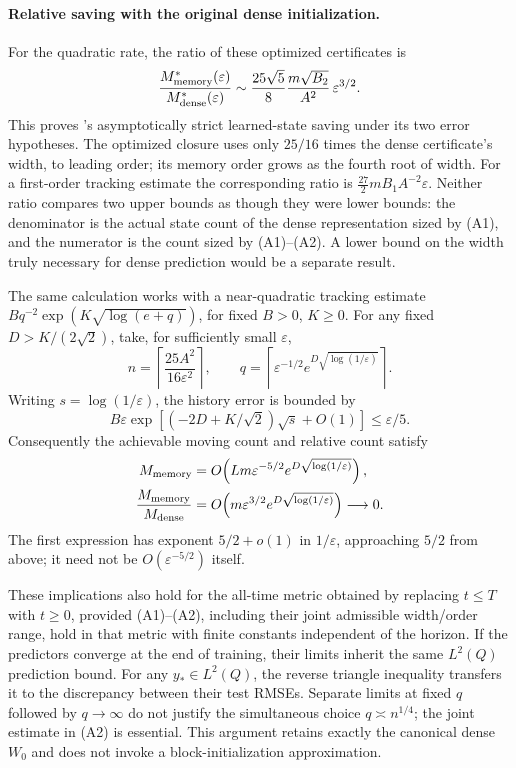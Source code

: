 \paragraph{Relative saving with the original dense initialization.}
For the quadratic rate, the ratio of these optimized certificates is
\begin{equation}
 \frac{M_{\rm memory}^*(\varepsilon)}{M_{\rm dense}^*(\varepsilon)}
 \sim\frac{25\sqrt5}{8}\frac{m\sqrt{B_2}}{A^2}\,
       \varepsilon^{3/2}.
 \label{cmp:relative-saving}
\end{equation}
This proves 's asymptotically strict learned-state
saving under its two error hypotheses.  The optimized closure uses only
$25/16$ times the dense certificate's width, to leading order; its memory
order grows as the fourth root of width.  For a first-order tracking estimate
the corresponding ratio is
$\tfrac{27}{2}mB_1A^{-2}\varepsilon$.
Neither ratio compares two upper bounds as though they were lower bounds:
the denominator is the actual state count of the dense representation sized
by (A1), and the numerator is the count sized by (A1)--(A2).  A lower bound on
the width truly necessary for dense prediction would be a separate result.

The same calculation works with a near-quadratic tracking estimate
$Bq^{-2}\exp(K\sqrt{\log(e+q)})$, for fixed $B>0$, $K\ge0$.
For any fixed $D>K/(2\sqrt2)$, take, for sufficiently small $\varepsilon$,
\[
 n=\left\lceil\frac{25A^2}{16\varepsilon^2}\right\rceil,\qquad
 q=\left\lceil\varepsilon^{-1/2}
                   e^{D\sqrt{\log(1/\varepsilon)}}\right\rceil.
\]
Writing $s=\log(1/\varepsilon)$, the history error is bounded by
\[
 B\varepsilon\exp\!\left[
       (-2D+K/\sqrt2)\sqrt s+O(1)\right]
 \le\varepsilon/5.
\]
Consequently the achievable moving count and relative count satisfy
\begin{align*}
 M_{\rm memory}&=O\!\left(Lm\varepsilon^{-5/2}
                               e^{D\sqrt{\log(1/\varepsilon)}}\right),\\
 \frac{M_{\rm memory}}{M_{\rm dense}}
   &=O\!\left(m\varepsilon^{3/2}
                               e^{D\sqrt{\log(1/\varepsilon)}}\right)
     \longrightarrow0.
\end{align*}
The first expression has exponent $5/2+o(1)$ in $1/\varepsilon$, approaching
$5/2$ from above; it need not be $O(\varepsilon^{-5/2})$ itself.

These implications also hold for the all-time metric obtained by replacing
$t\le T$ with $t\ge0$, provided (A1)--(A2), including their joint admissible
width/order range, hold in that metric with finite constants independent of
the horizon.  If the predictors converge at the end of training, their limits
inherit the same $L^2(Q)$ prediction bound.  For any $y_*\in L^2(Q)$, the
reverse triangle inequality transfers it to the discrepancy between their
test RMSEs.  Separate limits at fixed $q$ followed by $q\to\infty$ do not
justify the simultaneous choice $q\asymp n^{1/4}$; the joint estimate in
(A2) is essential.  This argument retains exactly the canonical dense
$W_0$ and does not invoke a block-initialization approximation.

